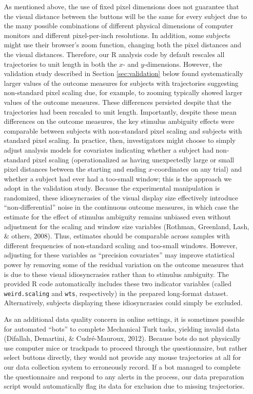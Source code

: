 \documentclass[]{article}
\begin{document}
As mentioned above, the use of fixed pixel dimensions does not guarantee
that the visual distance between the buttons will be the same for every
subject due to the many possible combinations of different physical
dimensions of computer monitors and different pixel-per-inch
resolutions. In addition, some subjects might use their browser's zoom
function, changing both the pixel distances and the visual distances.
Therefore, our R analysis code by default rescales all trajectories to
unit length in both the \(x\)- and \(y\)-dimensions. However, the
validation study described in Section \ref{sec:validation} below found
systematically larger values of the outcome measures for subjects with
trajectories suggesting non-standard pixel scaling due, for example, to
zooming typically showed larger values of the outcome measures. These
differences persisted despite that the trajectories had been rescaled to
unit length. Importantly, despite these mean differences on the outcome
measures, the key stimulus ambiguity effects were comparable between
subjects with non-standard pixel scaling and subjects with standard
pixel scaling. In practice, then, investigators might choose to simply
adjust analysis models for covariates indicating whether a subject had
non-standard pixel scaling (operationalized as having unexpectedly large
or small pixel distances between the starting and ending
\(x\)-coordinates on any trial) and whether a subject had ever had a
too-small window; this is the approach we adopt in the validation study.
Because the experimental manipulation is randomized, these
idiosyncrasies of the visual display size effectively introduce
``non-differential'' noise in the continuous outcome measures, in which
case the estimate for the effect of stimulus ambiguity remains unbiased
even without adjustment for the scaling and window size variables
(Rothman, Greenland, Lash, \& others, 2008). Thus, estimates should be
comparable across samples with different frequencies of non-standard
scaling and too-small windows. However, adjusting for these variables as
``precision covariates'' may improve statistical power by removing some
of the residual variation on the outcome measures that is due to these
visual idiosyncrasies rather than to stimulus ambiguity. The provided R
code automatically includes these two indicator variables (called
\texttt{weird.scaling} and \texttt{wts}, respectively) in the prepared
long-format dataset. Alternatively, subjects displaying these
idiosyncrasies could simply be excluded.

As an additional data quality concern in online settings, it is
sometimes possible for automated ``bots'' to complete Mechanical Turk
tasks, yielding invalid data (Difallah, Demartini, \& Cudré-Mauroux,
2012). Because bots do not physically use computer mice or trackpads to
proceed through the questionnaire, but rather select buttons directly,
they would not provide any mouse trajectories at all for our data
collection system to erroneously record. If a bot managed to complete
the questionnaire and respond to any alerts in the process, our data
preparation script would automatically flag its data for exclusion due
to missing trajectories.
\end{document}
